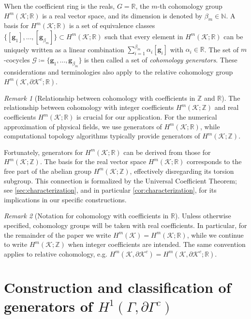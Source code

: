 \documentclass[a4paper,twoside,10pt]{article}
\theoremstyle{plain}
\theoremstyle{definition}
\theoremstyle{remark}
\newtheorem{remark}{Remark}
\newcommand{\mc}{\mathcal}
\newcommand{\R}{\mathbb{R}}
\newcommand{\Z}{\mathbb{Z}}
\newcommand{\K}{\mc{K}}
\newcommand{\cochain}[1]{\mathbf #1}
\begin{document}
When the coefficient ring is the reals, $G = \mathbb{R}$, the $m$-th cohomology group $H^m(\K; \mathbb{R})$ is a real vector space, and its dimension is denoted by $\beta_m \in \mathbb{N}$.
A basis for $H^m(\K; \mathbb{R})$ is a set of equivalence classes $\{[\cochain{g}_1], \dots, [\cochain{g}_{\beta_m}]\} \subset H^m(\K;\mathbb{R})$ such that every element in $H^m(\K;\mathbb{R})$ can be uniquely written as a linear combination $\sum_{i=1}^{\beta_m} \alpha_i[\cochain g_i]$ with $\alpha_i \in \mathbb{R}$.
The set of $m$-cocycles $\mc G \coloneqq \{\cochain{g}_1, \dots, \cochain{g}_{\beta_m}\}$ is then called a set of \emph{cohomology generators}.
These considerations and terminologies also apply to the relative cohomology group $H^m(\K, \partial \K^c; \mathbb{R})$.
\begin{remark}[Relationship between cohomology with coefficients in $\mathbb{Z}$ and $\mathbb{R}$]
The relationship between cohomology with integer coefficients $H^m(\K; \mathbb{Z})$ and real coefficients $H^m(\K; \mathbb{R})$ is crucial for our application.
For the numerical approximation of physical fields, we use generators of $H^m(\K; \mathbb{R})$, while computational topology algorithms typically provide generators of $H^m(\K; \mathbb{Z})$.

Fortunately, generators for $H^m(\K; \mathbb{R})$ can be derived from those for $H^m(\K; \mathbb{Z})$.
The basis for the real vector space $H^m(\K; \mathbb{R})$ corresponds to the free part of the abelian group $H^m(\K; \mathbb{Z})$, effectively disregarding its torsion subgroup.
This connection is formalized by the Universal Coefficient Theorem; see \cref{sec:characterization}, and in particular \cref{cor:characterization}, for its implications in our specific constructions.
\end{remark}

\begin{remark}[Notation for cohomology with coefficients in $\mathbb{R}$]
Unless otherwise specified, cohomology groups will be taken with real coefficients.
In particular, for the remainder of the paper we write $H^m(\K)=H^m(\K;\R)$, while we continue to write $H^m(\K;\Z)$ when integer coefficients are intended.
The same convention applies to relative cohomology, e.g. $H^m(\K,\partial\K^c)=H^m(\K,\partial\K^c;\R)$.
\end{remark}

\section{Construction and classification of generators of $H^1(\Gamma, \partial \Gamma^c)$}
\label{sec:algorithms}
\end{document}
